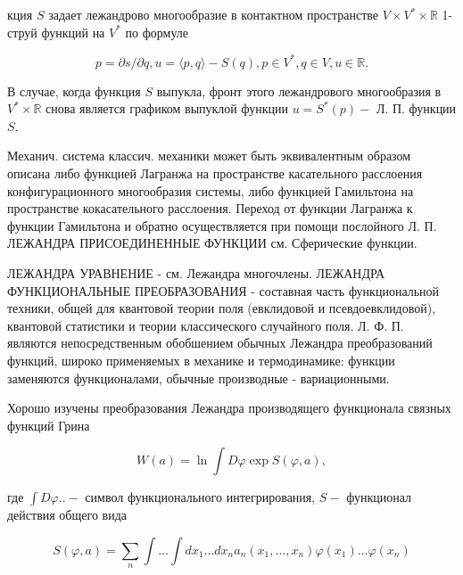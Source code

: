 \documentclass[10pt]{article}
\begin{document}
кция $S$ задает лежандрово многообразие в контактном пространстве $V \times V^{*} \times \mathbb{R}$ 1-струй функций на $V^{*}$ по формуле



\[

p=\partial s / \partial q, u=\langle p, q\rangle-S(q), p \in V^{*}, q \in V, u \in \mathbb{R} .

\]



В случае, когда функция $S$ выпукла, фронт этого лежандрового многообразия в $V^{*} \times \mathbb{R}$ снова является графиком выпуклой функции $u=S^{*}(p)-$ Л. П. функции $S$.



Механич. система классич. механики может быть эквивалентным образом описана либо функцией Лагранжа на пространстве касательного расслоения конфигурационного многообразия системы, либо функцией Гамильтона на пространстве кокасательного расслоения. Переход от функции Лагранжа к функции Гамильтона и обратно осуществляется при помощи послойного Л. П. ЛЕЖАНДРА ПРИСОЕДИНЕННЫЕ ФУНКЦИИ см. Сферические функции.



ЛЕЖАНДРА УРАВНЕНИЕ - см. Лежандра многочлены. ЛЕЖАНДРА ФУНКЦИОНАЛЬНЫЕ ПРЕОБРАЗОВАНИЯ - составная часть функциональной техники, общей для квантовой теории поля (евклидовой и псевдоевклидовой), квантовой статистики и теории классического случайного поля. Л. Ф. П. являются непосредственным обобшением обычных Лежандра преобразований функций, широко применяемых в механике и термодинамике: функции заменяются функционалами, обычные производные - вариационными.



Хорошо изучены преобразования Лежандра производящего функционала связных функций Грина



\[

W(a)=\ln \int D \varphi \exp S(\varphi, a),

\]



где $\int D \varphi . .-$ символ функционального интегрирования, $S-$ функционал действия общего вида



\[

S(\varphi, a)=\sum_{n} \int \ldots \int d x_{1} \ldots d x_{n} a_{n}\left(x_{1}, \ldots, x_{n}\right) \varphi\left(x_{1}\right) \ldots \varphi\left(x_{n}\right)

\]
\end{document}
